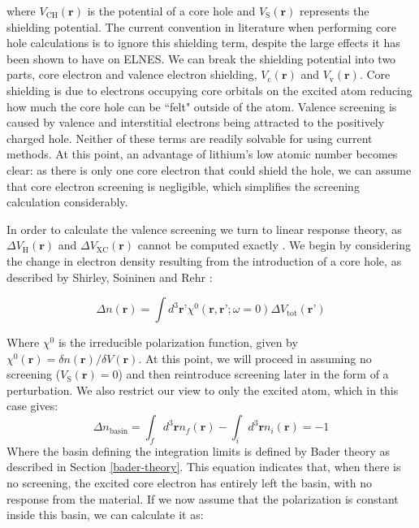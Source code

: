 where $V_{\mathrm{CH}}(\textbf{r})$ is the potential of a core hole and  $V_{\mathrm{S}}(\textbf{r})$ represents the shielding potential.  The current convention in literature when performing core hole calculations is to ignore this shielding term, despite the large effects it has been shown to have on ELNES.  We can break the shielding potential into two parts, core electron and valence electron shielding, $V_{\mathrm{c}}(\textbf{r})$ and  $V_{\mathrm{v}}(\textbf{r})$. Core shielding is due to electrons occupying core orbitals on the excited atom reducing how much the core hole can be ``felt" outside of the atom.  Valence screening is caused by valence and interstitial electrons being attracted to the positively charged hole.  Neither of these terms are readily solvable for using current methods.  At this point, an advantage of lithium's low atomic number becomes clear: as there is only one core electron that could shield the hole, we can assume that core electron screening is negligible, which simplifies the screening calculation considerably.  

In order to calculate the valence screening we turn to linear response theory, as  $\Delta V_{\mathrm{H}}(\textbf{r})$ and $\Delta V_{\mathrm{XC}}(\textbf{r})$ cannot be computed exactly  \cite{shirley_modeling_2005}.  We begin by considering the change in electron density resulting from the introduction of a core hole, as described by Shirley, Soininen and Rehr \cite{shirley_modeling_2005}:

\begin{equation}
\Delta n(\textbf{r}) = \int d^3 \textbf{r'} \chi^0(\textbf{r},\textbf{r'}; \omega = 0)\Delta V_{\mathrm{tot}}(\textbf{r'})
\end{equation}

Where $\chi^0$ is the irreducible polarization function, given by $\chi^0(\textbf{r}) = \delta n(\textbf{r}) /  \delta V(\textbf{r})$.  At this point, we will proceed in assuming no screening ($V_{\mathrm{S}}(\textbf{r})=0$) and then reintroduce screening later in the form of a perturbation.  We also restrict our view to only the excited atom, which in this case gives:
\begin{equation}
\Delta n _{\mathrm{basin}} = \int_{f}d^3\textbf{r} n_{f}(\textbf{r}) - \int_{i}d^3\textbf{r} n_i(\textbf{r})= -1
\label{density_calc}
\end{equation}
Where the basin defining the integration limits is defined by Bader theory as described in Section \ref{bader-theory}. This equation indicates that, when there is no screening,  the excited core electron has entirely left the basin, with no response from the material. If we now assume that the polarization is constant inside this basin, we can calculate it as: 

